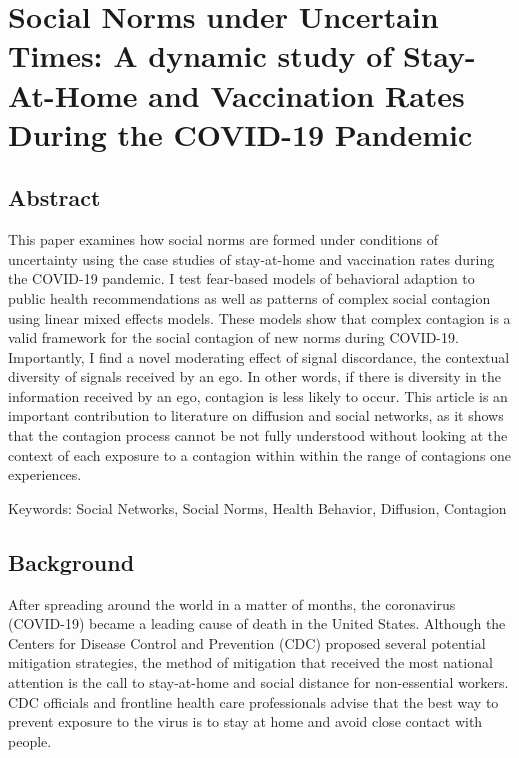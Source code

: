 \hypertarget{paper-3}{%
\chapter{Social Norms under Uncertain Times: A dynamic study of Stay-At-Home and Vaccination Rates During the COVID-19 Pandemic}\label{paper-3}}

\hypertarget{abstract-1}{%
\section{Abstract}\label{abstract-1}}

This paper examines how social norms are formed under conditions of uncertainty
using the case studies of stay-at-home and vaccination rates during the COVID-19
pandemic. I test fear-based models of behavioral adaption to public health
recommendations as well as patterns of complex social contagion using linear
mixed effects models. These models show that complex contagion is a valid
framework for the social contagion of new norms during COVID-19. Importantly, I
find a novel moderating effect of signal discordance, the contextual diversity
of signals received by an ego. In other words, if there is diversity in the
information received by an ego, contagion is less likely to occur. This article
is an important contribution to literature on diffusion and social networks, as
it shows that the contagion process cannot be not fully understood without
looking at the context of each exposure to a contagion within  within the range
of contagions one experiences.

Keywords: Social Networks, Social Norms, Health Behavior, Diffusion, Contagion

\hypertarget{background}{%
\section{Background}\label{background}}

After spreading around the world in a matter of months, the coronavirus
(COVID-19) became a leading cause of death in the United States. Although the
Centers for Disease Control and Prevention (CDC) \citeyearpar{centersfordiseasecontrolandpreventionHowProtectYourself2020} proposed several potential mitigation strategies, the method of mitigation that received the most national
attention is the call to stay-at-home and social distance for non-essential
workers. CDC officials and frontline health care professionals advise that the
best way to prevent exposure to the virus is to stay at home and avoid close
contact with people.

